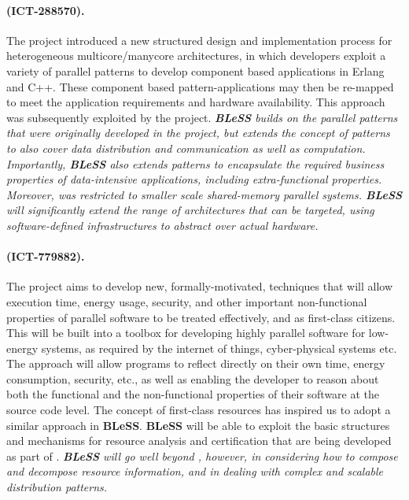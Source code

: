 \documentclass[a4paper,11pt]{article}
\newcommand{\project}[1]{\textbf{#1}\xspace}
\newcommand{\BLESS}{\project{BLeSS}}
\newcommand{\TheProject}{\BLESS}
\begin{document}
\vspace{-2pt}
\paragraph{\paraphrase (ICT-288570).}
The \paraphrase project introduced a new structured design and implementation process for
heterogeneous multicore/manycore architectures, in which developers exploit a variety of
parallel patterns to develop component based applications in Erlang and C++. These
component based pattern-applications may then be re-mapped to meet the
application requirements and hardware availability. 
This approach was subsequently exploited by the \rephrase project.
\emph{\TheProject{} builds on the parallel patterns that were originally developed in the \paraphrase project, but extends the concept of patterns
to also cover data distribution and communication as well as computation.
Importantly, \TheProject also extends patterns to encapsulate the required business properties of data-intensive applications, including extra-functional
properties.  Moreover, \paraphrase was restricted to
smaller scale shared-memory parallel systems. \TheProject{} will significantly
extend the range of architectures that can be targeted, using software-defined infrastructures to abstract over actual hardware.}

\vspace{-2pt}
\paragraph{\teamplay (ICT-779882).}
The \teamplay{} project aims to develop new, formally-motivated, techniques that will allow execution time, energy usage, security, and other important non-functional properties of parallel software to be treated effectively, and as first-class citizens. This will be built into a toolbox for developing highly parallel software for low-energy systems, as required by the internet of things, cyber-physical systems etc. The \teamplay{} approach will allow programs to reflect directly on their own time, energy consumption, security, etc., as well as enabling the developer to reason about both the functional and the non-functional properties of their software at the source code level.  The \teamplay{} concept of first-class resources has inspired us to adopt a similar approach in \TheProject{}.
\TheProject{} will be able to exploit the basic structures and mechanisms for resource analysis and certification that are
being developed as part of \teamplay{}.
\emph{\TheProject{} will go well beyond \teamplay{}, however, in considering how to compose and decompose resource information,
and in dealing with complex and scalable distribution patterns.}
\end{document}

